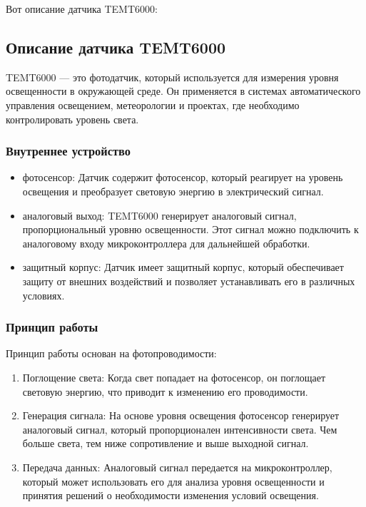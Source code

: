 \documentclass{bmstu}
\begin{document}
    Вот описание датчика TEMT6000:

    \subsection{Описание датчика TEMT6000}
    TEMT6000\cite{adminDatchikOsveshchennostiTEMT60002022} — это фотодатчик, который используется для измерения уровня освещенности в окружающей среде. Он применяется в системах автоматического управления освещением, метеорологии и проектах, где необходимо контролировать уровень света.

    \subsubsection{Внутреннее устройство}
    \begin{itemize}
        \item фотосенсор: Датчик содержит фотосенсор, который реагирует на уровень освещения и преобразует световую энергию в электрический сигнал.
        \item аналоговый выход: TEMT6000 генерирует аналоговый сигнал, пропорциональный уровню освещенности. Этот сигнал можно подключить к аналоговому входу микроконтроллера для дальнейшей обработки.
        \item защитный корпус: Датчик имеет защитный корпус, который обеспечивает защиту от внешних воздействий и позволяет устанавливать его в различных условиях.
    \end{itemize}

    \subsubsection{Принцип работы}
    Принцип работы основан на фотопроводимости:
    \begin{enumerate}
        \item Поглощение света: Когда свет попадает на фотосенсор, он поглощает световую энергию, что приводит к изменению его проводимости.
        \item Генерация сигнала: На основе уровня освещения фотосенсор генерирует аналоговый сигнал, который пропорционален интенсивности света. Чем больше света, тем ниже сопротивление и выше выходной сигнал.
        \item Передача данных: Аналоговый сигнал передается на микроконтроллер, который может использовать его для анализа уровня освещенности и принятия решений о необходимости изменения условий освещения.
    \end{enumerate}
\end{document}
